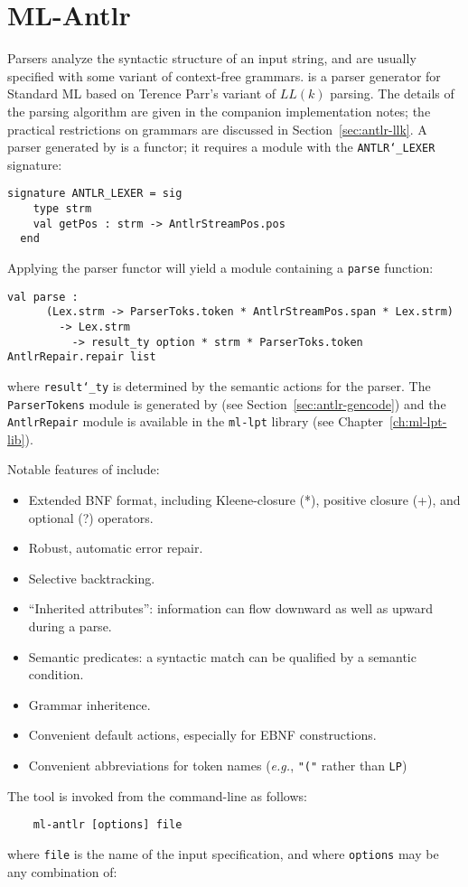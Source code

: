 %
\chapter{ML-Antlr}


Parsers analyze the syntactic structure of an input string, and are usually specified with some variant of context-free grammars.  \antlr{} is a parser generator for Standard ML based on Terence Parr's variant of $LL(k)$ parsing.  The details of the parsing algorithm are given in the companion implementation notes; the practical restrictions on grammars are discussed in Section~\ref{sec:antlr-llk}.  A parser generated by \antlr{} is a functor; it requires a module with the \texttt{ANTLR\char`\_LEXER} signature:
\begin{lstlisting}
signature ANTLR_LEXER = sig
    type strm
    val getPos : strm -> AntlrStreamPos.pos
  end
\end{lstlisting}
Applying the parser functor will yield a module containing a \texttt{parse} function:
\begin{lstlisting}
val parse : 
      (Lex.strm -> ParserToks.token * AntlrStreamPos.span * Lex.strm)
        -> Lex.strm
          -> result_ty option * strm * ParserToks.token AntlrRepair.repair list
\end{lstlisting}
where \texttt{result\char`\_ty} is determined by the semantic actions for the parser.  The \texttt{ParserTokens} module is generated by \antlr{} (see Section~\ref{sec:antlr-gencode}) and the \texttt{AntlrRepair} module is available in the \texttt{ml-lpt} library (see Chapter~\ref{ch:ml-lpt-lib}). 

Notable features of \antlr{} include:
\begin{itemize}
 \item Extended BNF format, including Kleene-closure (*), positive closure (+), and optional (?) operators.
 \item Robust, automatic error repair.
 \item Selective backtracking.
 \item ``Inherited attributes'': information can flow downward as well as upward during a parse.
 \item Semantic predicates: a syntactic match can be qualified by a semantic condition.
 \item Grammar inheritence.
 \item Convenient default actions, especially for EBNF constructions.
 \item Convenient abbreviations for token names (\emph{e{.}g{.}}, \texttt{"("} rather than \texttt{LP})
\end{itemize}
The tool is invoked from the command-line as follows:
\begin{verbatim}
    ml-antlr [options] file
\end{verbatim}
where \texttt{file} is the name of the input \ulex{} specification, and where \texttt{options} may be any combination of:

